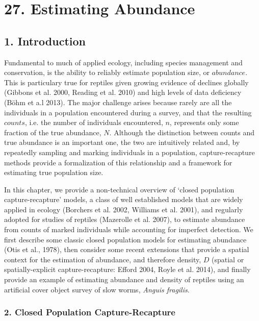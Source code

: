 \documentclass{book}
\begin{document}
\chapter*{27. Estimating Abundance\\
          }

\section*{1. Introduction}

Fundamental to much of applied ecology, including species management
and conservation, is the ability to reliably estimate population size,
or $abundance$. This is particulary true for reptiles given growing
evidence of declines globally (Gibbons et al. 2000, Reading et
al. 2010) and high levels of data deficiency (B{\"o}hm et a.l 2013). The
major challenge arises because rarely are all the individuals in a
population encountered during a survey, and that the
resulting $counts$, i.e. the number of individuals encountered, $n$,
represents only some fraction of the true abundance, $N$. Although the
distinction between counts and true abundance is an important one, the
two are intuitively related and, by repeatedly sampling and marking
individuals in a population, capture-recapture methods provide a
formalization of this relationship and a framework for estimating true
population size.

In this chapter, we provide a non-technical overview of `closed
population capture-recapture' models, a class of well established
models that are widely applied in ecology (Borchers et al. 2002,
Williams et al. 2001), and regularly adopted for studies of reptiles
(Mazerolle et al. 2007), to estimate abundance from counts of marked
individuals while accounting for imperfect detection. We first describe
some classic closed population models for estimating abundance (Otis
et al., 1978), then consider some recent extensions that provide a
spatial context for the estimation of abundance, and therefore
density, $D$ (spatial or spatially-explicit capture-recapture: Efford
2004, Royle et al. 2014), and finally provide an example of estimating
abundance and density of reptiles using an artificial cover object
survey of slow worms, \textit{Anguis fragilis}.

\subsection*{2. Closed Population Capture-Recapture}
\end{document}
